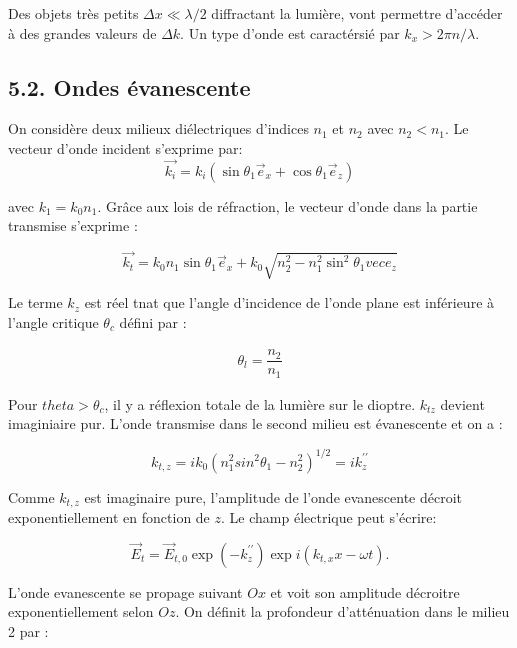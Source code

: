 \documentclass[french, a4paper, 10pt, twocolumn, landscape]{article}
\begin{document}
Des objets très petits $\Delta x \ll \lambda/2$ diffractant la lumière, vont permettre d'accéder à des grandes valeurs de $\Delta k$. Un type d'onde est caractérsié par $k_x>2\pi n /\lambda$.

\subsection*{5.2. Ondes évanescente}

On considère deux milieux diélectriques d'indices $n_1$ et $n_2$ avec $n_2<n_1$. Le vecteur d'onde incident s'exprime par:
\begin{equation}
	\vec{k_i}=k_i\left(\sin\theta_1\vec{e}_x+\cos\theta_1\vec{e}_z\right)
\end{equation}

avec $k_1=k_0n_1$. Grâce aux lois de réfraction, le vecteur d'onde dans la partie transmise s'exprime : 

\begin{equation}
	\vec{k_t}=k_0n_1\sin\theta_1\vec{e}_x+k_0\sqrt{n_2^2-n_1^2\sin^2\theta_1vec{e}_z}
\end{equation}

Le terme $k_z$ est réel tnat que l'angle d'incidence de l'onde plane est inférieure à l'angle critique $\theta_c$ défini par : 

\begin{eqnarray}
	\theta_l=\dfrac{n_2}{n_1}
\end{eqnarray}

Pour $theta>\theta_c$, il y a réflexion totale de la lumière sur le dioptre. $k_{tz}$ devient imaginiaire pur. L'onde transmise dans le second milieu est évanescente et on a : 

\begin{equation}
	k_{t,z} = ik_0\left(n_1^2sin^2\theta_1-n_2^2\right)^{1/2}=ik_z^{\prime\prime}
\end{equation}

Comme $k_{t,z}$ est imaginaire pure, l'amplitude de l'onde evanescente décroit exponentiellement en fonction de $z$. Le champ électrique peut s'écrire: 

\begin{equation}
	\vec{E}_t=\vec{E}_{t,0}\exp{(-k_z^{\prime\prime})}\exp{i(k_{t,x}x-\omega t)}.
\end{equation}

L'onde evanescente se propage suivant $Ox$ et voit son amplitude décroitre exponentiellement selon $Oz$. On définit la profondeur d'atténuation dans le milieu 2 par : 
\end{document}
